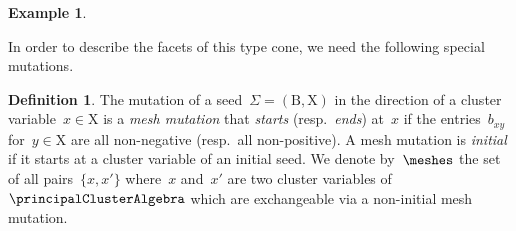 \documentclass{amsart}
\theoremstyle{definition}
\newtheorem{definition}[theorem]{Definition}
\newtheorem{example}[theorem]{Example}
\newcommand{\darkblue}{\color{darkblue}} %
\newcommand{\defn}[1]{\textsl{\darkblue #1}} %
\newcommand{\seed}{\Sigma} %
\newcommand{\cluster}{\mathrm{X}} %
\newcommand{\B}{\mathrm{B}} %
\begin{document}
\begin{example}
%
%
\end{example}

In order to describe the facets of this type cone, we need the following special mutations.

\begin{definition}
The mutation of a seed~$\seed = (\B, \cluster)$ in the direction of a cluster variable~$x \in \cluster$ is a \defn{mesh mutation} that \defn{starts} (resp.~\defn{ends}) at~$x$ if the entries~$b_{xy}$ for~$y \in \cluster$ are all non-negative (resp.~all non-positive).
A mesh mutation is \defn{initial} if it starts at a cluster variable of an initial seed.
We denote by~$\meshes$ the set of all pairs~$\{x,x'\}$ where~$x$ and~$x'$ are two cluster variables of~$\principalClusterAlgebra$ which are exchangeable via a non-initial mesh mutation.
\end{definition}
\end{document}
